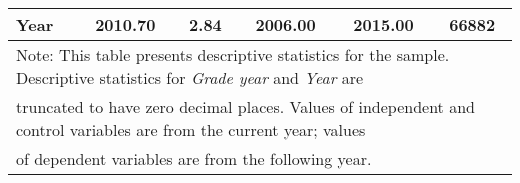 \begin{table}[htbp]
\begin{tabular}{l*{1}{ccccc}}
\hspace{0.25cm} Year&     2010.70&        2.84&     2006.00&     2015.00&       66882\\
\bottomrule
\multicolumn{6}{l}{\footnotesize Note: This table presents descriptive statistics for the sample. Descriptive statistics for \emph{Grade year} and \emph{Year} are }\\
\multicolumn{6}{l}{\footnotesize truncated to have zero decimal places. Values of independent and control variables are from the current year; values}\\
\multicolumn{6}{l}{\footnotesize of dependent variables are from the following year.}\\
\end{tabular}
\end{table}
